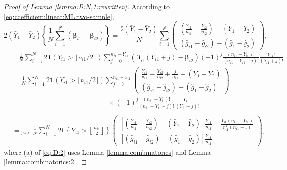 \documentclass[12pt,letterpaper]{article}
\begin{document}
\begin{proof}[Proof of Lemma \ref{lemma:D:N,1:rewritten}]
According to \eqref{eq:coefficient:linear:ML:two-sample}, 
\begin{equation}\label{eq:D:1}
2(\bar{Y}_1-\bar{Y}_2)\left\{\frac{1}{N}\sum_{i=1}^N(\boldsymbol{\beta}_{i1}-\boldsymbol{\beta}_{i2})\right\}=\frac{2(\bar{Y}_1-\bar{Y}_2)}{N}\sum_{i=1}^N\begin{pmatrix}
\displaystyle\left(\frac{Y_{i1}}{n_{i1}}-\frac{Y_{i2}}{n_{i2}}\right)-(\bar{Y}_1-\bar{Y}_2)\\
\displaystyle(\hat{g}_{i1}-\hat{g}_{i2})-(\hat{g}_1-\hat{g}_2)
\end{pmatrix},
\end{equation}
\begin{equation}\label{eq:D:2}
\begin{array}{rl}
&\displaystyle\quad\frac{1}{N}\sum_{i=1}^N2\mathbf{1}(Y_{i1} > \lfloor n_{i1}/2\rfloor)\!\!\!\sum_{j=0}^{n_{i1}-Y_{i1}}\!\!\!(\boldsymbol{\beta}_{i1}(Y_{i1}+j)-\boldsymbol{\beta}_{i2})(-1)^{j}\frac{(n_{i1}-Y_{i1})!}{(n_{i1}-Y_{i1}-j)!}\frac{Y_{i1}!}{(Y_{i1}+j)!}\\
&\displaystyle=\frac{1}{N}\sum_{i=1}^N2\mathbf{1}(Y_{i1} > \lfloor n_{i1}/2\rfloor)\!\!\!\sum_{j=0}^{n_{i1}-Y_{i1}}\!\!\!\begin{pmatrix}
\displaystyle\frac{Y_{i1}}{n_{i1}}-\frac{Y_{i2}}{n_{i2}}+\frac{j}{n_{i1}}-(\bar{Y}_1-\bar{Y}_2)\\
\displaystyle(\hat{g}_{i1}-\hat{g}_{i2})-(\hat{g}_1-\hat{g}_2)
\end{pmatrix}\\
&\quad\quad\quad\quad\quad\quad\quad\quad\quad\quad\quad\quad\quad\quad\displaystyle\times(-1)^{j}\frac{(n_{i1}-Y_{i1})!}{(n_{i1}-Y_{i1}-j)!}\frac{Y_{i1}!}{(Y_{i1}+j)!}\\
\\
&\displaystyle=_{(a)}\frac{1}{N}\sum_{i=1}^N2\mathbf{1}\left\{Y_{i1}>\left\lfloor\frac{n_{i1}}{2}\right\rfloor\right\}\begin{pmatrix}
\displaystyle\left[\left(\frac{Y_{i1}}{n_{i1}}-\frac{Y_{i2}}{n_{i2}}\right)-(\bar{Y}_1-\bar{Y}_2)\right]\frac{Y_{i1}}{n_{i1}}-\frac{Y_{i1}(n_{i1}-Y_{i1})}{n_{i1}^2(n_{i1}-1)}\\
\displaystyle[(\hat{g}_{i1}-\hat{g}_{i2})-(\hat{g}_1-\hat{g}_2)]\frac{Y_{i1}}{n_{i1}}
\end{pmatrix},
\end{array}
\end{equation}
where (a) of \eqref{eq:D:2} uses Lemma \ref{lemma:combinatorics} and Lemma \ref{lemma:combinatorics:2}. 

\end{proof}
\end{document}
